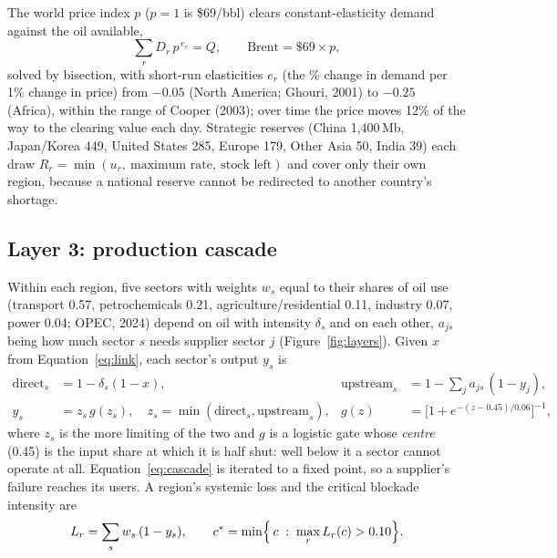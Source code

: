 \documentclass[11pt,a4paper]{article}
\begin{document}
The world price index $p$ ($p=1$ is \$69/bbl) clears constant-elasticity demand against the oil available,
\begin{equation}\label{eq:price}
\sum_{r} D_r\, p^{\,e_r} = Q, \qquad \text{Brent} = \$69 \times p ,
\end{equation}
solved by bisection, with short-run elasticities $e_r$ (the \% change in demand per 1\% change in price) from $-0.05$ (North America; Ghouri, 2001) to $-0.25$ (Africa), within the range of Cooper (2003); over time the price moves 12\% of the way to the clearing value each day. Strategic reserves (China 1,400\,Mb, Japan/Korea 449, United States 285, Europe 179, Other Asia 50, India 39) each draw $R_r=\min(u_r,\ \text{maximum rate},\ \text{stock left})$ and cover only their own region, because a national reserve cannot be redirected to another country's shortage.

\subsection{Layer 3: production cascade}

Within each region, five sectors with weights $w_s$ equal to their shares of oil use (transport 0.57, petrochemicals 0.21, agriculture/residential 0.11, industry 0.07, power 0.04; OPEC, 2024) depend on oil with intensity $\delta_s$ and on each other, $a_{js}$ being how much sector $s$ needs supplier sector $j$ (Figure~\ref{fig:layers}). Given $x$ from Equation~\eqref{eq:link}, each sector's output $y_s$ is
\begin{equation}\label{eq:cascade}
\begin{aligned}
\text{direct}_s &= 1-\delta_s(1-x), & \text{upstream}_s &= 1-\textstyle\sum_j a_{js}\,(1-y_j),\\
y_s &= z_s\, g(z_s), \quad z_s=\min(\text{direct}_s,\text{upstream}_s), & g(z) &= \bigl[1+e^{-(z-0.45)/0.06}\bigr]^{-1},
\end{aligned}
\end{equation}
where $z_s$ is the more limiting of the two and $g$ is a logistic gate whose \emph{centre} (0.45) is the input share at which it is half shut: well below it a sector cannot operate at all. Equation~\eqref{eq:cascade} is iterated to a fixed point, so a supplier's failure reaches its users. A region's systemic loss and the critical blockade intensity are
\begin{equation}\label{eq:loss}
L_r = \sum_s w_s\,(1-y_s), \qquad c^{*} = \min\Bigl\{\,c \;:\; \max_r L_r(c) > 0.10 \Bigr\}.
\end{equation}
\end{document}

